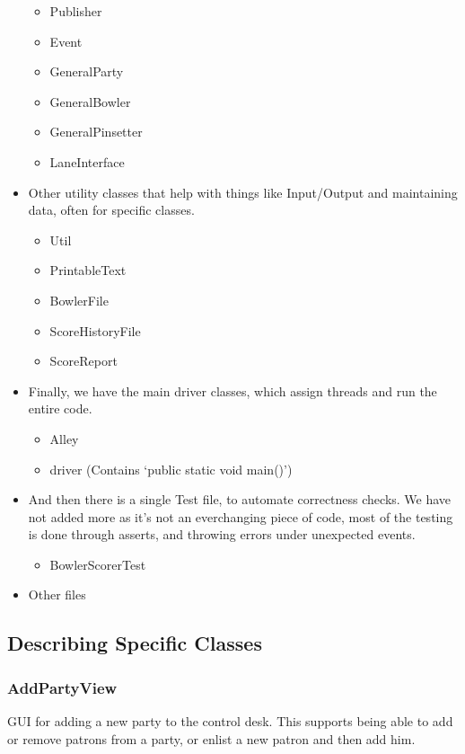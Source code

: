 \begin{itemize}
\begin{itemize}
              \item Publisher
              \item Event
              \item GeneralParty
              \item GeneralBowler
              \item GeneralPinsetter
              \item LaneInterface
          \end{itemize}
    \item Other utility classes that help with things like Input/Output and maintaining data, often for specific classes.
          \begin{itemize}
              \item Util
              \item PrintableText
              \item BowlerFile
              \item ScoreHistoryFile
              \item ScoreReport
          \end{itemize}
    \item Finally, we have the main driver classes, which assign threads and run the entire code.
          \begin{itemize}
              \item Alley
              \item driver (Contains `public static void main()')
          \end{itemize}
    \item And then there is a single Test file, to automate correctness checks. We have not added more as it's not an everchanging piece of code, most of the testing is done through asserts, and throwing errors under unexpected events.
          \begin{itemize}
              \item BowlerScorerTest
          \end{itemize}
    \item Other files
\end{itemize}


\subsection{Describing Specific Classes}

\subsubsection{AddPartyView}
GUI for adding a new party to the control desk. This supports being able to add or remove patrons from a party, or enlist a new patron and then add him.


